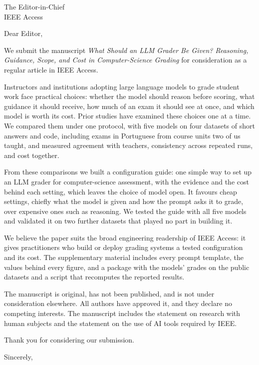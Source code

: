 \documentclass[11pt]{letter}
\begin{document}
\begin{letter}{The Editor-in-Chief\\IEEE Access}
\opening{Dear Editor,}

We submit the manuscript \emph{What Should an LLM Grader Be Given? Reasoning, Guidance, Scope, and Cost in
Computer-Science Grading} for consideration as a regular article in IEEE Access.

Instructors and institutions adopting large language models to grade student work face practical choices:
whether the model should reason before scoring, what guidance it should receive, how much of an exam it
should see at once, and which model is worth its cost. Prior studies have examined these choices one at a
time. We compared them under one protocol, with five models on four datasets of short answers and code,
including exams in Portuguese from course units two of us taught, and measured agreement with teachers, consistency across
repeated runs, and cost together.

From these comparisons we built a configuration guide: one simple way to set up an LLM grader for
computer-science assessment, with the evidence and the cost behind each setting, which leaves the choice of
model open. It favours cheap settings, chiefly what the model is given and how the prompt asks it to grade, over
expensive ones such as reasoning. We tested the guide with all five models and validated it on two further
datasets that played no part in building it.

We believe the paper suits the broad engineering readership of IEEE Access: it gives practitioners who build
or deploy grading systems a tested configuration and its cost. The supplementary material includes every
prompt template, the values behind every figure, and a package with the models' grades on the public datasets
and a script that recomputes the reported results.

The manuscript is original, has not been published, and is not under consideration elsewhere. All authors
have approved it, and they declare no competing interests. The manuscript includes the statement on research with human subjects and the statement
on the use of AI tools required by IEEE.

Thank you for considering our submission.

\closing{Sincerely,}
\end{letter}
\end{document}
